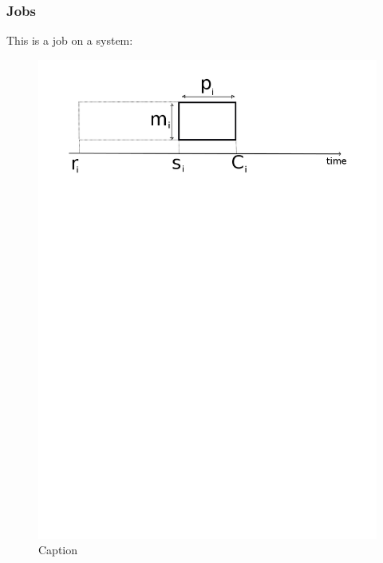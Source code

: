 \documentclass{beamer}
\begin{document}
\begin{frame}
  \frametitle{Jobs}

  This is a job on a system:
  \begin{figure}[H]
          \centerin
          \includegraphics[width=\textwidth]{job_system.png}
          \caption{Caption}
          \label{fig:job_jpg}
  \end{figure}

\end{frame}
\label{sub:jobs}


\end{document}
